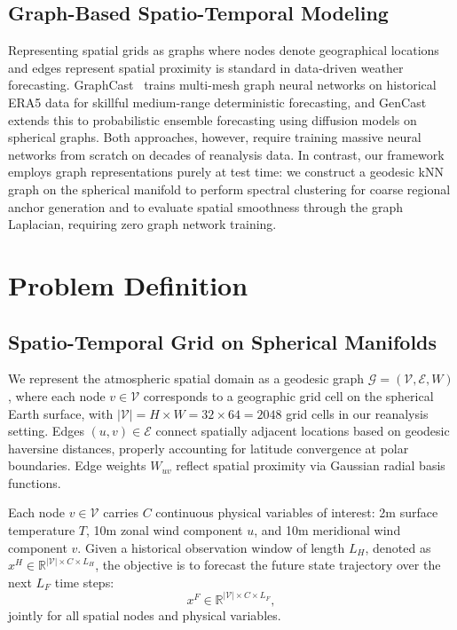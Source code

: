 \documentclass[preprint,12pt]{elsarticle}
\begin{document}
\subsection{Graph-Based Spatio-Temporal Modeling}
Representing spatial grids as graphs where nodes denote geographical locations and edges represent spatial proximity is standard in data-driven weather forecasting. GraphCast~\citep{lam2023graphcast} trains multi-mesh graph neural networks on historical ERA5 data for skillful medium-range deterministic forecasting, and GenCast~\citep{price2025gencast} extends this to probabilistic ensemble forecasting using diffusion models on spherical graphs. Both approaches, however, require training massive neural networks from scratch on decades of reanalysis data. In contrast, our framework employs graph representations purely at test time: we construct a geodesic kNN graph on the spherical manifold to perform spectral clustering for coarse regional anchor generation and to evaluate spatial smoothness through the graph Laplacian, requiring zero graph network training.

\section{Problem Definition}
\label{sec:problem}

\subsection{Spatio-Temporal Grid on Spherical Manifolds}
We represent the atmospheric spatial domain as a geodesic graph $\mathcal{G} = (\mathcal{V}, \mathcal{E}, W)$, where each node $v \in \mathcal{V}$ corresponds to a geographic grid cell on the spherical Earth surface, with $|\mathcal{V}| = H \times W = 32 \times 64 = 2048$ grid cells in our reanalysis setting. Edges $(u, v) \in \mathcal{E}$ connect spatially adjacent locations based on geodesic haversine distances, properly accounting for latitude convergence at polar boundaries. Edge weights $W_{uv}$ reflect spatial proximity via Gaussian radial basis functions.

Each node $v \in \mathcal{V}$ carries $C$ continuous physical variables of interest: 2m surface temperature $T$, 10m zonal wind component $u$, and 10m meridional wind component $v$. Given a historical observation window of length $L_H$, denoted as $x^H \in \mathbb{R}^{|\mathcal{V}| \times C \times L_H}$, the objective is to forecast the future state trajectory over the next $L_F$ time steps:
\begin{equation}
x^F \in \mathbb{R}^{|\mathcal{V}| \times C \times L_F},
\end{equation}
jointly for all spatial nodes and physical variables.
\end{document}
